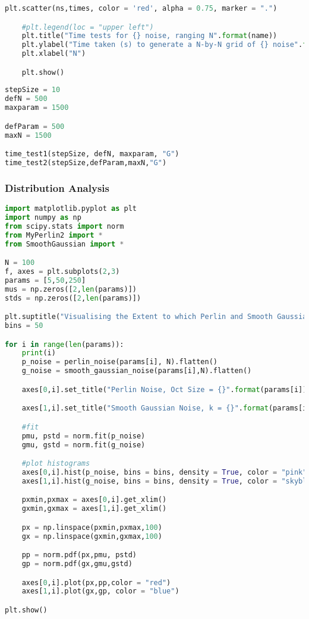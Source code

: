 \documentclass[11pt,a4paper]{article}
\begin{document}
\begin{lstlisting}[language=Python, mathescape=true]
    plt.scatter(ns,times, color = 'red', alpha = 0.75, marker = ".")

    #plt.legend(loc = "upper left")
    plt.title("Time tests for {} noise, ranging N".format(name))
    plt.ylabel("Time taken (s) to generate a N-by-N grid of {} noise".format(name))
    plt.xlabel("N")

    plt.show()
    
stepSize = 10
defN = 500
maxparam = 1500

defParam = 500
maxN = 1500

time_test1(stepSize, defN, maxparam, "G")
time_test2(stepSize,defParam,maxN,"G")
\end{lstlisting}

\subsubsection{Distribution Analysis}
\begin{lstlisting}[language=Python, mathescape=true]
import matplotlib.pyplot as plt
import numpy as np
from scipy.stats import norm
from MyPerlin2 import *
from SmoothGaussian import *

N = 100
f, axes = plt.subplots(2,3)
params = [5,50,250]
mus = np.zeros([2,len(params)])
stds = np.zeros([2,len(params)])

plt.suptitle("Visualising the Extent to which Perlin and Smooth Gaussian noises are Normally Distributed")
bins = 50

for i in range(len(params)):
    print(i)
    p_noise = perlin_noise(params[i], N).flatten()
    g_noise = smooth_gaussian_noise(params[i],N).flatten()   

    axes[0,i].set_title("Perlin Noise, Oct Size = {}".format(params[i]))

    axes[1,i].set_title("Smooth Gaussian Noise, k = {}".format(params[i]))

    #fit
    pmu, pstd = norm.fit(p_noise)
    gmu, gstd = norm.fit(g_noise)

    #plot histograms
    axes[0,i].hist(p_noise, bins = bins, density = True, color = "pink")
    axes[1,i].hist(g_noise, bins = bins, density = True, color = "skyblue")

    pxmin,pxmax = axes[0,i].get_xlim()
    gxmin,gxmax = axes[1,i].get_xlim()

    px = np.linspace(pxmin,pxmax,100)
    gx = np.linspace(gxmin,gxmax,100)

    pp = norm.pdf(px,pmu, pstd)
    gp = norm.pdf(gx,gmu,gstd)

    axes[0,i].plot(px,pp,color = "red")
    axes[1,i].plot(gx,gp, color = "blue")

plt.show()
\end{lstlisting}
\end{document}
